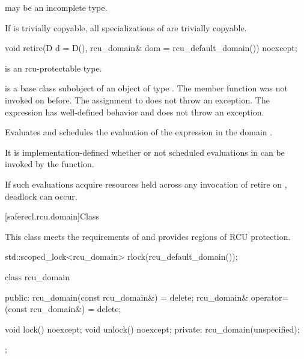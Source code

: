 \pnum
{} may be an incomplete type.

\pnum
If  is trivially copyable, all specializations of
 are trivially copyable.

\begin{itemdecl}
void retire(D d = D(), rcu_domain& dom = rcu_default_domain()) noexcept;
\end{itemdecl}

\begin{itemdescr}

\pnum
\mandates
{} is an rcu-protectable type.

\pnum
\expects
{} is a base class subobject of
an object  of type . The member function
 was not invoked on 
before. The assignment to  does not throw an
exception. The expression  has
well-defined behavior and does not throw an exception.

\pnum
\effects
Evaluates  and schedules
the evaluation of the expression  in the domain .

\pnum
\remarks
It is implementation-defined whether or not scheduled
evaluations in  can be invoked by the 
function.
\begin{note}
If such evaluations acquire resources held across any invocation of
retire on , deadlock can occur.
\end{note}

\end{itemdescr}

[saferecl.rcu.domain]{Class }


This class meets the requirements of   and provides regions of RCU protection.

\begin{example}
\begin{codeblock}
std::scoped_lock<rcu_domain> rlock(rcu_default_domain());
\end{codeblock}
\end{example}

\begin{codeblock}
class rcu_domain {
public:
  rcu_domain(const rcu_domain&) = delete;
  rcu_domain& operator=(const rcu_domain&) = delete;

  void lock() noexcept;
  void unlock() noexcept;
private:
  rcu_domain(unspecified);
};
\end{codeblock}

